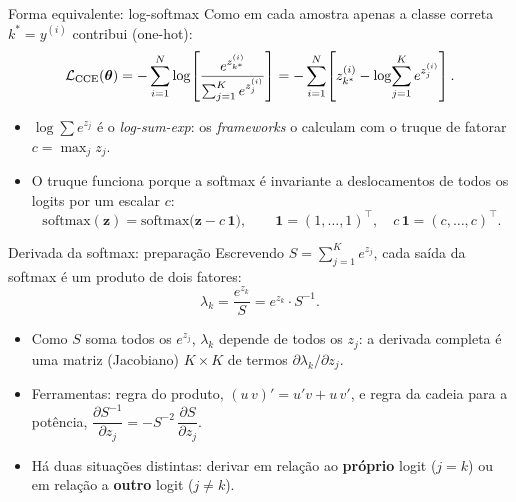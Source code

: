 \documentclass[aspectratio=169,xcolor=dvipsnames]{beamer}
\begin{document}
  \begin{frame}{Forma equivalente: log-softmax}
    Como em cada amostra apenas a classe correta $k^{*} = y^{(i)}$ contribui (one-hot):
    \[
      \mathcal{L}_{\text{CCE}}(\bm{\theta})
        = -\sum_{i=1}^{N}\log\!\left[\frac{e^{z_{k^{*}}^{(i)}}}{\sum_{j=1}^{K} e^{z_{j}^{(i)}}}\right]
        = -\sum_{i=1}^{N}\!\left[z_{k^{*}}^{(i)} - \log\!\sum_{j=1}^{K} e^{z_{j}^{(i)}}\right].
    \]
    \begin{itemize}
      \item $\log\sum e^{z_j}$ é o \textit{log-sum-exp}: os \textit{frameworks} o calculam
        com o truque de fatorar $c=\max_j z_j$.
      \item O truque funciona porque a softmax é invariante a deslocamentos de todos os logits por um escalar $c$:
        \[
          \mathrm{softmax}(\mathbf{z}) = \mathrm{softmax}\big(\mathbf{z}-c\,\mathbf{1}\big),
          \qquad \mathbf{1} = (1,\ldots,1)^{\top},
          \quad c\,\mathbf{1} = (c,\ldots,c)^{\top}.
        \]
    \end{itemize}
  \end{frame}

  \begin{frame}{Derivada da softmax: preparação}
    Escrevendo $S = \sum_{j=1}^{K} e^{z_j}$, cada saída da softmax é um produto de dois fatores:
    \[
      \lambda_k = \frac{e^{z_k}}{S} = e^{z_k}\cdot S^{-1}.
    \]
    \begin{itemize}
      \item Como $S$ soma todos os $e^{z_j}$, $\lambda_k$ depende de \alert{todos} os $z_j$:
        a derivada completa é uma matriz (Jacobiano) $K\times K$ de termos
        $\partial\lambda_k/\partial z_j$.
      \item Ferramentas: regra do produto, $(u\,v)' = u'v + u\,v'$, e regra da cadeia
        para a potência, $\dfrac{\partial S^{-1}}{\partial z_j} = -S^{-2}\,\dfrac{\partial S}{\partial z_j}$.
      \item Há duas situações distintas: derivar em relação ao \textbf{próprio} logit
        ($j = k$) ou em relação a \textbf{outro} logit ($j \ne k$).
    \end{itemize}
  \end{frame}
\end{document}
